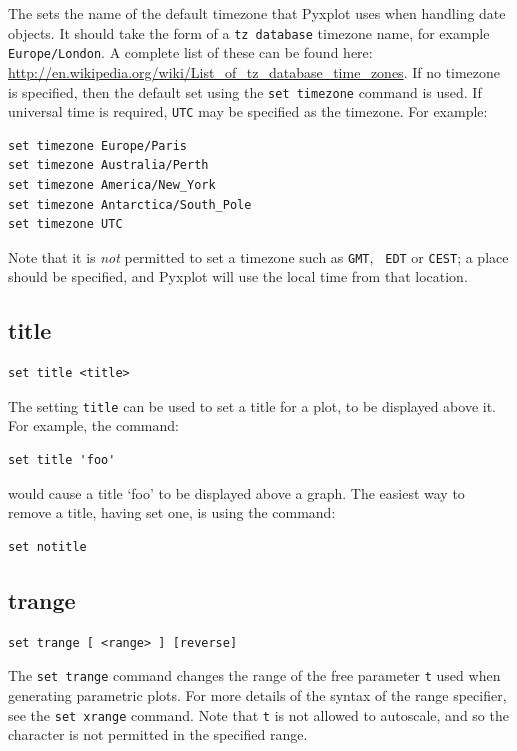 The  sets the name of the default timezone that Pyxplot
uses when handling date objects. It should take the form of a {\tt tz database}
timezone name, for example {\tt Europe/London}. A complete list of these can be
found here: \url{http://en.wikipedia.org/wiki/List_of_tz_database_time_zones}.
If no timezone is specified, then the default set using the {\tt set timezone}
command is used. If universal time is required, {\tt UTC} may be specified as
the timezone. For example:

\begin{verbatim}
set timezone Europe/Paris
set timezone Australia/Perth
set timezone America/New_York
set timezone Antarctica/South_Pole
set timezone UTC
\end{verbatim}

Note that it is {\it not} permitted to set a timezone such as {\tt GMT}, {\tt
EDT} or {\tt CEST}; a place should be specified, and Pyxplot will use the local
time from that location.

\subsection{title}

\begin{verbatim}
set title <title>
\end{verbatim}

The setting {\tt title} can be used to set a title for a plot, to be displayed
above it.  For example, the command:

\begin{verbatim}
set title 'foo'
\end{verbatim}

\noindent would cause a title `foo' to be displayed above a graph. The easiest
way to remove a title, having set one, is using the command:

\begin{verbatim}
set notitle
\end{verbatim}


\subsection{trange}

\begin{verbatim}
set trange [ <range> ] [reverse]
\end{verbatim}

The {\tt set trange} command changes the range of the free parameter {\tt t}
used when generating parametric plots.  For more details of the syntax of the
range specifier, see the {\tt set xrange} command. Note that {\tt t} is not
allowed to autoscale, and so the {\tt *} character is not permitted in the
specified range.

